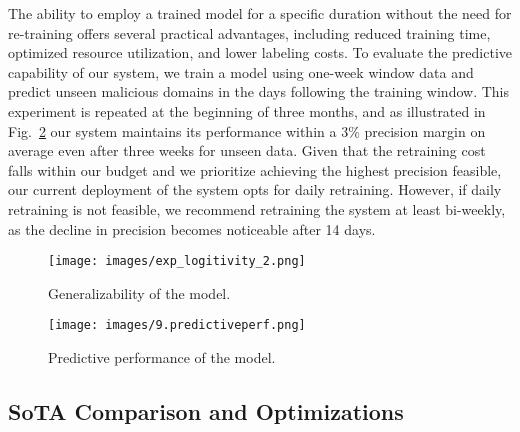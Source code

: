 The ability to employ a trained model for a specific duration without the need for re-training offers several practical advantages, including reduced training time, optimized resource utilization, and lower labeling costs. To evaluate the predictive capability of our system, we train a model using one-week window data and predict unseen malicious domains in the days following the training window. This experiment is repeated at the beginning of three months, and as illustrated in Fig.~\ref{fig:predictiveperf} our system maintains its performance within a 3\% precision margin on average even after three weeks for unseen data. Given that the retraining cost falls within our budget and we prioritize achieving the highest precision feasible, our current deployment of the system opts for daily retraining. However, if daily retraining is not feasible, we recommend retraining the system at least bi-weekly, as the decline in precision becomes noticeable after 14 days.

\begin{figure}
\centering
\texttt{[image: images/exp\_logitivity\_2.png]}
\caption{Generalizability of the model.}
\label{fig:exp_logitivity}
\end{figure}

\begin{figure}
\centering
\texttt{[image: images/9.predictiveperf.png]}
\caption{Predictive performance of the model.}
\label{fig:predictiveperf}
\end{figure}

\subsection{SoTA Comparison and Optimizations}\label{subsec:ablation}

